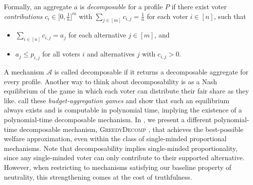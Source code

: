 \documentclass[11pt]{article}
\newcommand{\A}{\mathcal{A}}
\newcommand{\GrdDec}{\textsc{GreedyDecomp} }
\begin{document}
Formally, an aggregate $a$ is \textit{decomposable} for a profile $P$ if there exist voter \textit{contributions} $c_i \in \big[0, \frac{1}{n}\big]^m$ with $\sum_{j \in [m]} c_{i,j} = \frac{1}{n}$ for each voter $i \in [n]$, such that
\begin{itemize}
    \item $\sum_{i \in [n]} c_{i,j} = a_j$ for each alternative $j \in [m]$, and
    \item $a_j \le p_{i,j}$ for all voters $i$ and alternatives $j$ with $c_{i,j} > 0$.
\end{itemize}
A mechanism $\A$ is called decomposable if it returns a decomposable aggregate for every profile. Another way to think about decomposability is as a Nash equilibrium of the game in which each voter can distribute their fair share as they like. \citet{becker2025efficiently} call these \textit{budget-aggregation games} and show that such an equilibrium always exists and is computable in polynomial time, implying the existence of a polynomial-time decomposable mechanism.  
In , we present a different polynomial-time decomposable mechanism, \GrdDec, that achieves the best-possible welfare approximation, even within the class of single-minded proportional mechanisms. Note that decomposability implies single-minded proportionality, since any single-minded voter can only contribute to their supported alternative.
However, when restricting to mechanisms satisfying our baseline property of neutrality, this strengthening comes at the cost of truthfulness. 
\end{document}
